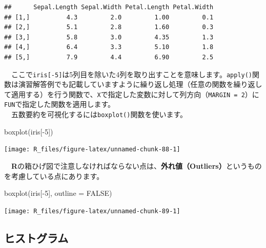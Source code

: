 \documentclass[
  12pt,
]{book}
\newenvironment{Shaded}{\begin{snugshade}}{\end{snugshade}}
\newcommand{\AttributeTok}[1]{\textcolor[rgb]{0.77,0.63,0.00}{#1}}
\newcommand{\ConstantTok}[1]{\textcolor[rgb]{0.00,0.00,0.00}{#1}}
\newcommand{\DecValTok}[1]{\textcolor[rgb]{0.00,0.00,0.81}{#1}}
\newcommand{\FunctionTok}[1]{\textcolor[rgb]{0.00,0.00,0.00}{#1}}
\newcommand{\NormalTok}[1]{#1}
\newcommand{\SpecialCharTok}[1]{\textcolor[rgb]{0.00,0.00,0.00}{#1}}
\begin{document}
\begin{verbatim}
##      Sepal.Length Sepal.Width Petal.Length Petal.Width
## [1,]          4.3         2.0         1.00         0.1
## [2,]          5.1         2.8         1.60         0.3
## [3,]          5.8         3.0         4.35         1.3
## [4,]          6.4         3.3         5.10         1.8
## [5,]          7.9         4.4         6.90         2.5
\end{verbatim}

　ここで\texttt{iris{[}-5{]}}は5列目を除いた4列を取り出すことを意味します。\texttt{apply()}関数は演習解答例でも記載していますように繰り返し処理（任意の関数を繰り返して適用する）を行う関数で、\texttt{X}で指定した変数に対して列方向（\texttt{MARGIN\ =\ 2}）に\texttt{FUN}で指定した関数を適用します。\\
　五数要約を可視化するには\texttt{boxplot()}関数を使います。

\begin{Shaded}
\begin{Highlighting}[numbers=left,,]
\FunctionTok{boxplot}\NormalTok{(iris[}\SpecialCharTok{{-}}\DecValTok{5}\NormalTok{])}
\end{Highlighting}
\end{Shaded}

\begin{center}\texttt{[image: R\_files/figure-latex/unnamed-chunk-88-1]} \end{center}

　\textbf{R}の箱ひげ図で注意しなければならない点は、\textbf{外れ値（Outliers）}というものを考慮している点にあります。

\begin{Shaded}
\begin{Highlighting}[numbers=left,,]
\FunctionTok{boxplot}\NormalTok{(iris[}\SpecialCharTok{{-}}\DecValTok{5}\NormalTok{], }\AttributeTok{outline =} \ConstantTok{FALSE}\NormalTok{)}
\end{Highlighting}
\end{Shaded}

\begin{center}\texttt{[image: R\_files/figure-latex/unnamed-chunk-89-1]} \end{center}

\hypertarget{ux30d2ux30b9ux30c8ux30b0ux30e9ux30e0}{%
\subsection{ヒストグラム}\label{ux30d2ux30b9ux30c8ux30b0ux30e9ux30e0}}
\end{document}
